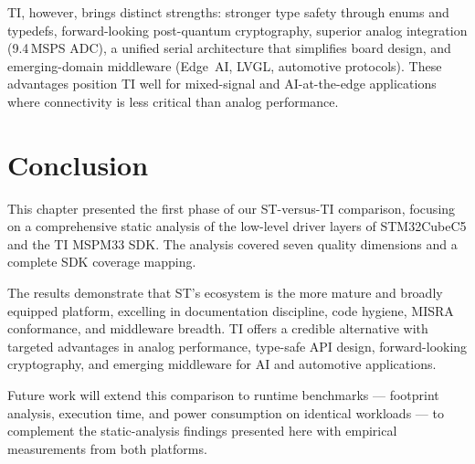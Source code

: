 TI, however, brings distinct strengths: stronger type safety through enums and typedefs,
forward-looking post-quantum cryptography, superior analog integration (9.4\,MSPS ADC), a
unified serial architecture that simplifies board design, and emerging-domain middleware
(Edge~AI, LVGL, automotive protocols). These advantages position TI well for mixed-signal
and AI-at-the-edge applications where connectivity is less critical than analog performance.

\newpage
\section*{Conclusion}

This chapter presented the first phase of our ST-versus-TI comparison, focusing on a
comprehensive static analysis of the low-level driver layers of STM32CubeC5 and the TI
MSPM33 SDK. The analysis covered seven quality dimensions and a complete SDK coverage
mapping.

The results demonstrate that ST's ecosystem is the more mature and broadly equipped
platform, excelling in documentation discipline, code hygiene, MISRA conformance, and
middleware breadth. TI offers a credible alternative with targeted advantages in analog
performance, type-safe API design, forward-looking cryptography, and emerging middleware for
AI and automotive applications.

Future work will extend this comparison to runtime benchmarks --- footprint analysis,
execution time, and power consumption on identical workloads --- to complement the
static-analysis findings presented here with empirical measurements from both platforms.